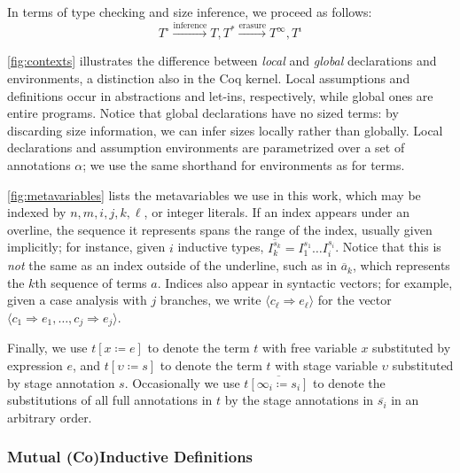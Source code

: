 \documentclass[sigplan,10pt,anonymous,review]{acmart}
\begin{document}
In terms of type checking and size inference, we proceed as follows:
\begin{equation*}
    T^\circ \xrightarrow{\text{inference}} T, T^* \xrightarrow{\text{erasure}} T^\infty, T^\iota
\end{equation*}



\autoref{fig:contexts} illustrates the difference between \textit{local} and \textit{global} declarations and environments, a distinction also in the Coq kernel. Local assumptions and definitions occur in abstractions and let-ins, respectively, while global ones are entire programs. Notice that global declarations have no sized terms: by discarding size information, we can infer sizes locally rather than globally. Local declarations and assumption environments are parametrized over a set of annotations $\alpha$; we use the same shorthand for environments as for terms.



\autoref{fig:metavariables} lists the metavariables we use in this work, which may be indexed by $n, m, i, j, k, \ell$, or integer literals. If an index appears under an overline, the sequence it represents spans the range of the index, usually given implicitly; for instance, given $i$ inductive types, $\overline{I_k^{s_k}} = I_1^{s_1} \dots I_i^{s_i}$. Notice that this is \textit{not} the same as an index outside of the underline, such as in $\overline{a}_k$, which represents the $k$th sequence of terms $a$. Indices also appear in syntactic vectors; for example, given a case analysis with $j$ branches, we write $\langle c_\ell \Rightarrow e_\ell \rangle$ for the vector $\langle c_1 \Rightarrow e_1, \dots, c_j \Rightarrow e_j \rangle$.

Finally, we use $t[x \coloneqq e]$ to denote the term $t$ with free variable $x$ substituted by expression $e$, and $t[\upsilon \coloneqq s]$ to denote the term $t$ with stage variable $\upsilon$ substituted by stage annotation $s$. Occasionally we use $t\overline{[\infty_i \coloneqq s_i]}$ to denote the substitutions of all full annotations in $t$ by the stage annotations in $\overline{s_i}$ in an arbitrary order.

\subsubsection{Mutual (Co)Inductive Definitions}
\end{document}
